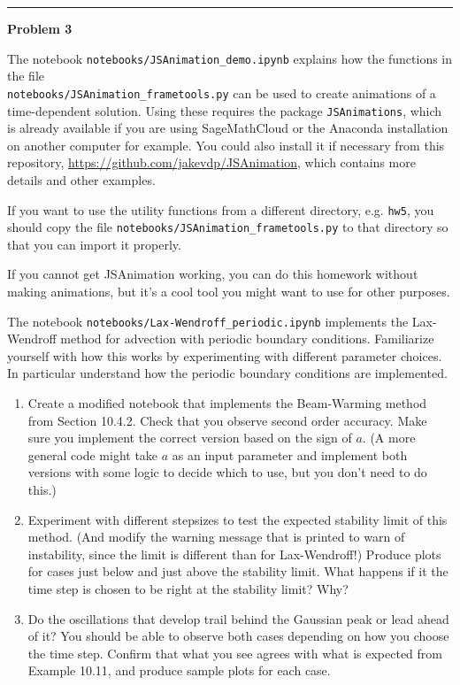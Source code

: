 \documentclass[10pt]{article}
\begin{document}
\vskip 1cm
\hrule
{\bf Problem 3}  

The notebook \verb+notebooks/JSAnimation_demo.ipynb+ explains how the 
functions in the file \\
\verb+notebooks/JSAnimation_frametools.py+ can be
used to create animations of a time-dependent solution.  Using these requires
the package \verb+JSAnimations+, which is already available if you are using
SageMathCloud or the Anaconda installation on another computer for example.
You could also install it if necessary from this repository, 
\url{https://github.com/jakevdp/JSAnimation}, which contains
more details and other examples.

If you want to use the utility functions from a different directory, e.g.
\verb+hw5+, you should copy the file
\verb+notebooks/JSAnimation_frametools.py+ 
to that directory so that you can import it properly.

If you cannot get JSAnimation working, you can do this homework
without making animations, but it's a cool tool you might want to
use for other purposes.

The notebook \verb+notebooks/Lax-Wendroff_periodic.ipynb+ 
implements the Lax-Wendroff method for advection with periodic boundary
conditions.  Familiarize yourself with how this works by experimenting with
different parameter choices.  In particular understand how the periodic
boundary conditions are implemented.

\begin{enumerate}
\item Create a modified notebook that implements the Beam-Warming method from
Section 10.4.2.  Check that you observe second order accuracy.  Make sure you
implement the correct version based on the sign of $a$.  (A more general code
might take $a$ as an input parameter and implement both versions with some
logic to decide which to use, but you don't need to do this.)

\item
Experiment with different stepsizes to test the expected stability limit
of this method.  (And modify the warning message that is printed to warn of
instability, since the limit is different than for Lax-Wendroff!)
Produce plots for cases just below and just above the stability limit.  What
happens if it the time step is chosen to be right at the stability limit?  Why?

\item
Do the oscillations that develop trail behind the Gaussian peak or lead ahead
of it?  You should be able to observe both cases depending on how you choose
the time step.  Confirm that what you see agrees with what is expected 
from Example 10.11, and produce sample plots for each case.

\end{enumerate}




\end{document}

